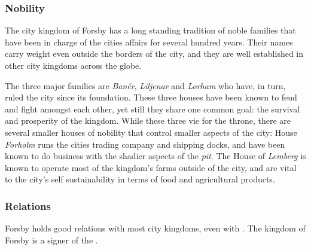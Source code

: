 \subsubsection{Nobility}

The city kingdom of Forsby has a long standing tradition of noble
families that have been in charge of the cities affairs for several hundred
years. Their names carry weight even outside the borders of the city, and
they are well established in other city kingdoms across the globe.

The three major families are \emph{Banér}, \emph{Liljenar} and \emph{Lorham}
who have, in turn, ruled the city since its foundation. These three houses
have been known to feud and fight amongst each other, yet still they share one
common goal: the survival and prosperity of the kingdom. While these three vie
for the throne, there are several smaller houses of nobility that control
smaller aspects of the city: House \emph{Forholm} runs the cities trading
company and shipping docks, and have been known to do business with the
shadier aspects of the \emph{pit}. The House of \emph{Lemberg} is known to
operate most of the kingdom's farms outside of the city, and are vital to the
city's self sustainability in terms of food and agricultural products.

\subsubsection{Relations}

Forsby holds good relations with most city kingdoms, even with
. The kingdom of Forsby is a signer of the
.
